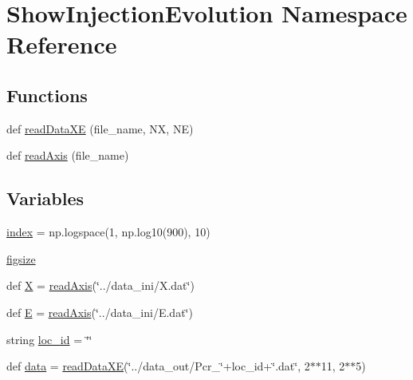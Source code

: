\hypertarget{namespaceShowInjectionEvolution}{}\section{Show\+Injection\+Evolution Namespace Reference}
\label{namespaceShowInjectionEvolution}
\subsection*{Functions}
\begin{DoxyCompactItemize}
\item 
def \hyperlink{namespaceShowInjectionEvolution_ac24e892d8f8ecf08f3901b9bd220f77a}{read\+Data\+XE} (file\+\_\+name, NX, NE)
\item 
def \hyperlink{namespaceShowInjectionEvolution_a2380d6044884c630c5e40c94605fa2b5}{read\+Axis} (file\+\_\+name)
\end{DoxyCompactItemize}
\subsection*{Variables}
\begin{DoxyCompactItemize}
\item 
\hyperlink{namespaceShowInjectionEvolution_aac193835af306eaeae4c8d5980dba5dd}{index} = np.\+logspace(1, np.\+log10(900), 10)
\item 
\hyperlink{namespaceShowInjectionEvolution_aa6c142c8312ecdeabc9ec03932fbce22}{figsize}
\item 
def \hyperlink{namespaceShowInjectionEvolution_a42b56552665798d4038f9992f1dfb229}{X} = \hyperlink{namespaceShowInjectionEvolution_a2380d6044884c630c5e40c94605fa2b5}{read\+Axis}(\char`\"{}../data\+\_\+ini/X.\+dat\char`\"{})
\item 
def \hyperlink{namespaceShowInjectionEvolution_afa2bd0dd1a23bac32907411d9af601ac}{E} = \hyperlink{namespaceShowInjectionEvolution_a2380d6044884c630c5e40c94605fa2b5}{read\+Axis}(\char`\"{}../data\+\_\+ini/E.\+dat\char`\"{})
\item 
string \hyperlink{namespaceShowInjectionEvolution_a853455210c1a2cc97c7701c741207f7f}{loc\+\_\+id} = \char`\"{}\char`\"{}
\item 
def \hyperlink{namespaceShowInjectionEvolution_a7a8f81171dfb9da43855595bdca41c45}{data} = \hyperlink{namespaceShowInjectionEvolution_ac24e892d8f8ecf08f3901b9bd220f77a}{read\+Data\+XE}(\char`\"{}../data\+\_\+out/Pcr\+\_\+\char`\"{}+loc\+\_\+id+\char`\"{}.dat\char`\"{}, 2$\ast$$\ast$11, 2$\ast$$\ast$5)
\end{DoxyCompactItemize}


